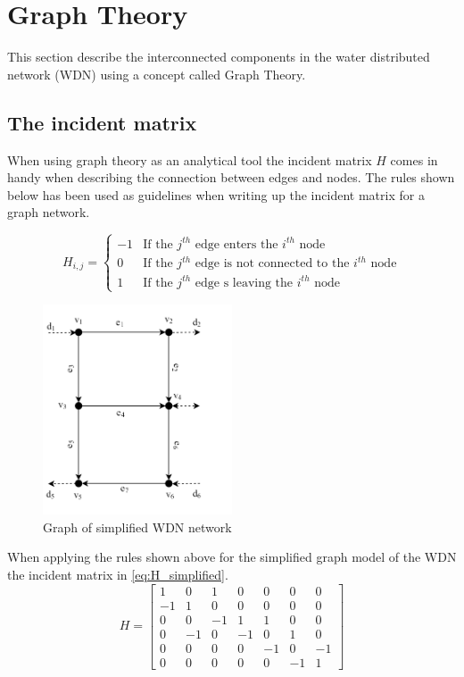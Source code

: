 \section{Graph Theory}
This section describe the interconnected components in the water distributed network (WDN) using a concept called Graph Theory.

\subsection{The incident matrix}
When using graph theory as an analytical tool the incident matrix $H$ comes in handy when describing the connection between edges and nodes. The rules shown below has been used as guidelines when writing up the incident matrix for a graph network. 

\begin{equation*}
H_{i,j} = \begin{cases}
    -1 & \text{If the $j^{th}$ edge enters the $i^{th}$ node} \\
    0 & \text{If the $j^{th}$ edge is not connected to the $i^{th}$ node} \\
    1 & \text{If the $j^{th}$ edge s leaving the $i^{th}$ node}
\end{cases}
\end{equation*} %

\begin{figure}[h!]
	\centering
	\includegraphics[width=0.5\textwidth]{Pictures/Graph.png}
	\caption{Graph of simplified WDN network \cite{Rathore930}}
	\label{fig:graph}
\end{figure}

When applying the rules shown above for the simplified graph model of the WDN the incident matrix in \eqref{eq:H_simplified}.
\begin{equation}
    H = \begin{bmatrix}
1 & 0 & 1 & 0 & 0 & 0 & 0\\
-1 & 1 & 0 & 0 & 0 & 0 & 0\\
0 & 0 & -1 & 1 & 1 & 0 & 0\\
0 & -1 & 0 & -1 & 0 & 1 & 0\\
0 & 0 & 0 & 0 & -1 &  0  & -1\\
0 & 0 & 0 & 0 & 0 & -1 & 1
\end{bmatrix}
\label{eq:H_simplified}
\end{equation} %

